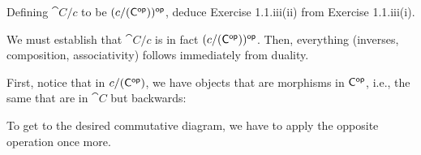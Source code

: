 \documentclass[notes,tikz]{agony}
\begin{document}
\begin{xca}
  Defining $\cat C/c$ to be $(c/(\mathsf{C}^{\mathsf{op}}))^{\mathsf{op}}$,
  deduce Exercise 1.1.iii(ii) from Exercise 1.1.iii(i).
\end{xca}
\begin{prf}
  We must establish that $\cat C/c$ is in fact $(c/(\mathsf{C}^{\mathsf{op}}))^{\mathsf{op}}$.
  Then, everything (inverses, composition, associativity) follows immediately from duality.

  First, notice that in $c/(\mathsf{C}^{\mathsf{op}})$,
  we have objects that are morphisms in $\mathsf{C}^{\mathsf{op}}$, i.e.,
  the same that are in $\cat C$ but backwards:
  \begin{center}
  \end{center}
  To get to the desired commutative diagram, we have to apply the opposite operation once more.
\end{prf}
\end{document}
